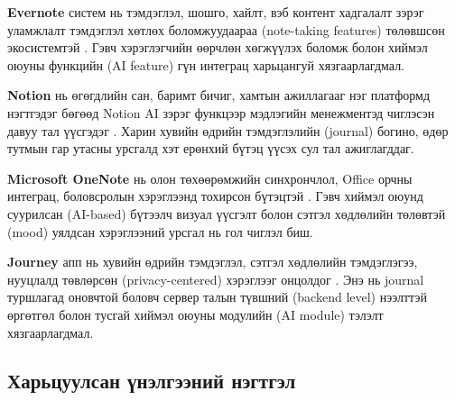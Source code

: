 \textbf{Evernote} систем нь тэмдэглэл, шошго, хайлт, вэб контент хадгалалт зэрэг уламжлалт тэмдэглэл хөтлөх боломжуудаараа (note-taking features) төлөвшсөн экосистемтэй \cite{evernote_help}. Гэвч хэрэглэгчийн өөрчлөн хөгжүүлэх боломж болон хиймэл оюуны функцийн (AI feature) гүн интеграц харьцангуй хязгаарлагдмал.

\textbf{Notion} нь өгөгдлийн сан, баримт бичиг, хамтын ажиллагааг нэг платформд нэгтгэдэг бөгөөд Notion AI зэрэг функцээр мэдлэгийн менежментэд чиглэсэн давуу тал үүсгэдэг \cite{notion_help}. Харин хувийн өдрийн тэмдэглэлийн (journal) богино, өдөр тутмын гар утасны урсгалд хэт ерөнхий бүтэц үүсэх сул тал ажиглагддаг.

\textbf{Microsoft OneNote} нь олон төхөөрөмжийн синхрончлол, Office орчны интеграц, боловсролын хэрэглээнд тохирсон бүтэцтэй \cite{onenote_docs}. Гэвч хиймэл оюунд суурилсан (AI-based) бүтээлч визуал үүсгэлт болон сэтгэл хөдлөлийн төлөвтэй (mood) уялдсан хэрэглээний урсгал нь гол чиглэл биш.

\textbf{Journey} апп нь хувийн өдрийн тэмдэглэл, сэтгэл хөдлөлийн тэмдэглэгээ, нууцлалд төвлөрсөн (privacy-centered) хэрэглээг онцолдог \cite{journey_docs}. Энэ нь journal туршлагад оновчтой боловч сервер талын түвшний (backend level) нээлттэй өргөтгөл болон тусгай хиймэл оюуны модулийн (AI module) тэлэлт хязгаарлагдмал.

\subsection{Харьцуулсан үнэлгээний нэгтгэл}

